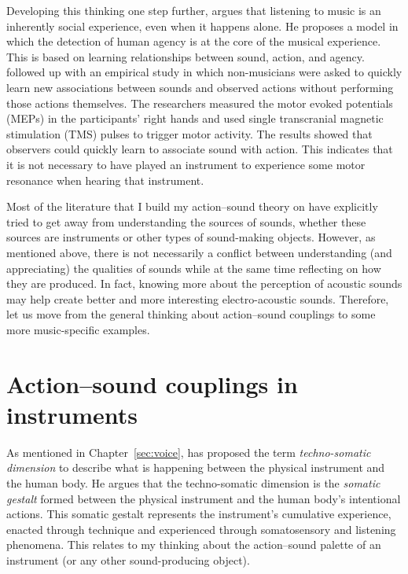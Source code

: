 Developing this thinking one step further, \citet{launay_musical_2015} argues that listening to music is an inherently social experience, even when it happens alone. He proposes a model in which the detection of human agency is at the core of the musical experience. This is based on learning relationships between sound, action, and agency.
\citet{launay_rapid_2016} followed up with an empirical study in which non-musicians were asked to quickly learn new associations between sounds and observed actions without performing those actions themselves. The researchers measured the motor evoked potentials (MEPs) in the participants’ right hands and used single transcranial magnetic stimulation (TMS) pulses to trigger motor activity. The results showed that observers could quickly learn to associate sound with action. This indicates that it is not necessary to have played an instrument to experience some motor resonance when hearing that instrument.

Most of the literature that I build my action--sound theory on have explicitly tried to get away from understanding the sources of sounds, whether these sources are instruments or other types of sound-making objects. However, as mentioned above, there is not necessarily a conflict between understanding (and appreciating) the qualities of sounds while at the same time reflecting on how they are produced. In fact, knowing more about the perception of acoustic sounds may help create better and more interesting electro-acoustic sounds. Therefore, let us move from the general thinking about action--sound couplings to some more music-specific examples.


\section{Action--sound couplings in instruments}

As mentioned in Chapter~\ref{sec:voice}, \citet{paine_interaction_2015} has proposed the term \emph{techno-somatic dimension} to describe what is happening between the physical instrument and the human body. He argues that the techno-somatic dimension is the \emph{somatic gestalt} formed between the physical instrument and the human body's intentional actions. This somatic gestalt represents the instrument's cumulative experience, enacted through technique and experienced through somatosensory and listening phenomena. This relates to my thinking about the action--sound palette of an instrument (or any other sound-producing object).

